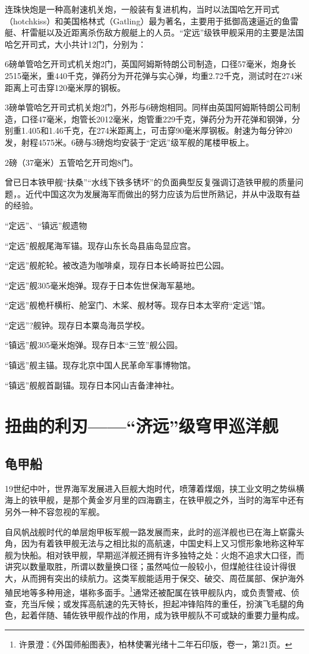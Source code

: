 \documentclass[12pt,UTF8]{ctexbook}
\begin{document}
连珠快炮是一种高射速机关炮，一般装有复进机构，当时以法国哈乞开司式（hotchkiss）和美国格林式（Gatling）最为著名，主要用于抵御高速逼近的鱼雷艇、杆雷艇以及近距离杀伤敌方舰艇上的人员。“定远”级铁甲舰采用的主要是法国哈乞开司式，大小共计12门，分别为：

6磅单管哈乞开司式机关炮2门，英国阿姆斯特朗公司制造，口径57毫米，炮身长2515毫米，重440千克，弹药分为开花弹与实心弹，均重2.72千克，测试时在274米距离上可击穿120毫米厚的钢板。

3磅单管哈乞开司式机关炮2门，外形与6磅炮相同。同样由英国阿姆斯特朗公司制造，口径47毫米，炮管长2012毫米，炮管重229千克，弹药分为开花弹和钢弹，分别重1.405和1.46千克，在274米距离上，可击穿90毫米厚钢板。射速为每分钟20发，射程4575米。6磅与3磅炮均安装于“定远”级军舰的尾楼甲板上。


2磅（37毫米）五管哈乞开司炮8门。

曾已日本铁甲舰“扶桑”“水线下铁多锈坏”的负面典型反复强调订造铁甲舰的质量问题，。近代中国这次为发展海军而做出的努力应该为后世所熟记，并从中汲取有益的经验。

“定远”、“镇远”舰遗物

“定远”舰舰尾海军锚。现存山东长岛县庙岛显应宫。

“定远”舰舵轮。被改造为咖啡桌，现存日本长崎哥拉巴公园。

“定远”舰305毫米炮弹。现存于日本佐世保海军墓地。

“定远”舰桅杆横桁、舱室门、木桨、舰材等。现存日本太宰府“定远”馆。

“定远”?舰钟。现存日本粟岛海员学校。

“镇远”舰305毫米炮弹。现存日本“三笠”舰公园。

“镇远”舰主锚。现存北京中国人民革命军事博物馆。

“镇远”舰舰首副锚。现存日本冈山吉备津神社。

\chapter{扭曲的利刃——“济远”级穹甲巡洋舰}

\section{龟甲船}

19世纪中叶，世界海军发展进入巨舰大炮时代，喷薄着煤烟，挟工业文明之势纵横海上的铁甲舰，是那个黄金岁月里的四海霸主，在铁甲舰之外，当时的海军中还有另外一种不容忽视的军舰。

自风帆战舰时代的单层炮甲板军舰一路发展而来，此时的巡洋舰也已在海上崭露头角，因为有着铁甲舰无法与之相比拟的高航速，中国史料上又习惯形象地称这种军舰为快船。相对铁甲舰，早期巡洋舰还拥有许多独特之处：火炮不追求大口径，而讲究以数量取胜，所谓以数量换口径；虽然吨位一般较小，但煤舱往往设计得很大，从而拥有突出的续航力。这类军舰能适用于保交、破交、周莅属部、保护海外殖民地等多种用途，堪称多面手。\footnote{许景澄：《外国师船图表》，柏林使署光绪十二年石印版，卷一，第21页。}通常还被配属在铁甲舰队内，或负责警戒、侦查，充当斥候；或发挥高航速的先天特长，担起冲锋陷阵的重任，扮演飞毛腿的角色，起着伴随、辅佐铁甲舰作战的作用，成为铁甲舰队不可或缺的重要力量构成。
\end{document}
